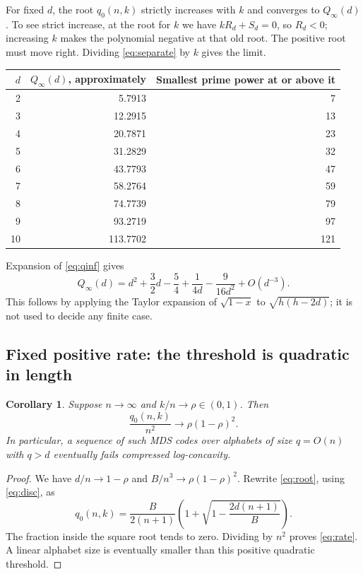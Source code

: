 \documentclass[11pt,letterpaper]{article}
\numberwithin{equation}{section}
\newtheorem{corollary}[theorem]{Corollary}
\theoremstyle{definition}
\begin{document}
For fixed $d$, the root $q_0(n,k)$ strictly increases with $k$ and
converges to $Q_\infty(d)$. To see strict increase, at the root for
$k$ we have $kR_d+S_d=0$, so $R_d<0$; increasing $k$ makes the
polynomial negative at that old root. The positive root must move
right. Dividing \eqref{eq:separate} by $k$ gives the limit.

\begin{center}
\begin{tabular}{@{}rrr@{}}
\toprule
$d$ & $Q_\infty(d)$, approximately & Smallest prime power at or above it\\
\midrule
2 & 5.7913 & 7 \\
3 & 12.2915 & 13 \\
4 & 20.7871 & 23 \\
5 & 31.2829 & 32 \\
6 & 43.7793 & 47 \\
7 & 58.2764 & 59 \\
8 & 74.7739 & 79 \\
9 & 93.2719 & 97 \\
10 & 113.7702 & 121 \\
\bottomrule
\end{tabular}
\end{center}

Expansion of \eqref{eq:qinf} gives
\begin{equation}\label{eq:qinf-asymp}
 Q_\infty(d)=d^2+\frac32d-\frac54+\frac{1}{4d}
              -\frac{9}{16d^2}+O(d^{-3}).
\end{equation}
This follows by applying the Taylor expansion of $\sqrt{1-x}$ to
$\sqrt{h(h-2d)}$; it is not used to decide any finite case.

\subsection{Fixed positive rate: the threshold is quadratic in length}
\begin{corollary}\label{cor:rate}
Suppose $n\to\infty$ and $k/n\to\rho\in(0,1)$. Then
\begin{equation}\label{eq:rate}
 \frac{q_0(n,k)}{n^2}\longrightarrow\rho(1-\rho)^2.
\end{equation}
In particular, a sequence of such MDS codes over alphabets of size
$q=O(n)$ with $q>d$ eventually fails compressed log-concavity.
\end{corollary}
\begin{proof}
We have $d/n\to1-\rho$ and
$B/n^3\to\rho(1-\rho)^2$. Rewrite \eqref{eq:root}, using
\eqref{eq:disc}, as
\[
 q_0(n,k)=\frac{B}{2(n+1)}
       \left(1+\sqrt{1-\frac{2d(n+1)}B}\right).
\]
The fraction inside the square root tends to zero. Dividing by
$n^2$ proves \eqref{eq:rate}. A linear alphabet size is eventually
smaller than this positive quadratic threshold.
\end{proof}
\end{document}
